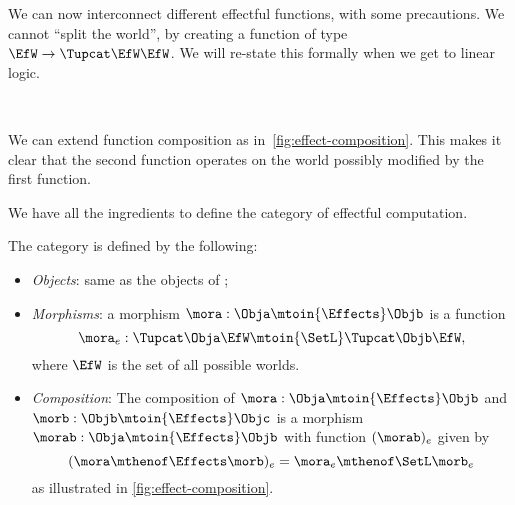 We can now interconnect different effectful functions, with some precautions.
We cannot ``split the world'', by creating a function of type $\EfW \to \Tupcat \EfW \EfW$.
We will re-state this formally when we get to linear logic.

\begin{marginfigure}
    \centering
    \\
    \caption{}
    \label{fig:effect-composition}
\end{marginfigure}

We can extend function composition as in~\cref{fig:effect-composition}.
This makes it clear that the second function operates on the world possibly modified by the first function.

We have all the ingredients to define the category \Effects of effectful computation.

\begin{definition}
    The \Effects category is defined by the following:
    \begin{itemize}
        \item \emph{Objects}: same as the objects of \SetL;
        \item \emph{Morphisms}: a morphism $\mora: \Obja \mtoin{\Effects} \Objb$ is a function
              \begin{equation}
                  \mora_e: \Tupcat \Obja \EfW \mtoin{\SetL} \Tupcat \Objb \EfW,
              \end{equation}
              where $\EfW$ is the set of all possible worlds.
        \item \emph{Composition}: The composition of  $\mora: \Obja \mtoin{\Effects} \Objb$ and
              $\morb: \Objb \mtoin{\Effects} \Objc$ is a morphism $\morab: \Obja \mtoin{\Effects} \Objb$ with function $(\morab)_e$ given by
              \begin{equation}
                  (\mora \mthenof \Effects \morb)
                  _e = \mora_e \mthenof\SetL \morb_e
              \end{equation}
              as illustrated in \cref{fig:effect-composition}.
    \end{itemize}
\end{definition}

